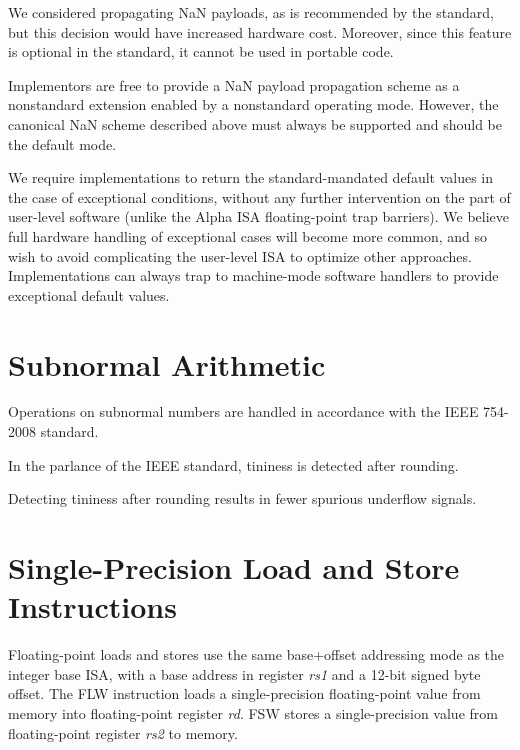 \begin{commentary}
We considered propagating NaN payloads, as is recommended by the standard,
but this decision would have increased hardware cost.  Moreover, since this
feature is optional in the standard, it cannot be used in portable code.

Implementors are free to provide a NaN payload propagation scheme as
a nonstandard extension enabled by a nonstandard operating mode.  However, the
canonical NaN scheme described above must always be supported and should be
the default mode.
\end{commentary}

\begin{commentary}
We require implementations to return the standard-mandated default
values in the case of exceptional conditions, without any further
intervention on the part of user-level software (unlike the Alpha ISA
floating-point trap barriers).  We believe full hardware handling of
exceptional cases will become more common, and so wish to avoid
complicating the user-level ISA to optimize other approaches.
Implementations can always trap to machine-mode software handlers to
provide exceptional default values.
\end{commentary}

\section{Subnormal Arithmetic}

Operations on subnormal numbers are handled in accordance with the IEEE
754-2008 standard.

In the parlance of the IEEE standard, tininess is detected after rounding.

\begin{commentary}
Detecting tininess after rounding results in fewer spurious underflow signals.
\end{commentary}

\section{Single-Precision Load and Store Instructions}

Floating-point loads and stores use the same base+offset addressing
mode as the integer base ISA, with a base address in register {\em
  rs1} and a 12-bit signed byte offset.  The FLW instruction loads a
single-precision floating-point value from memory into floating-point
register {\em rd}.  FSW stores a single-precision value from
floating-point register {\em rs2} to memory.

